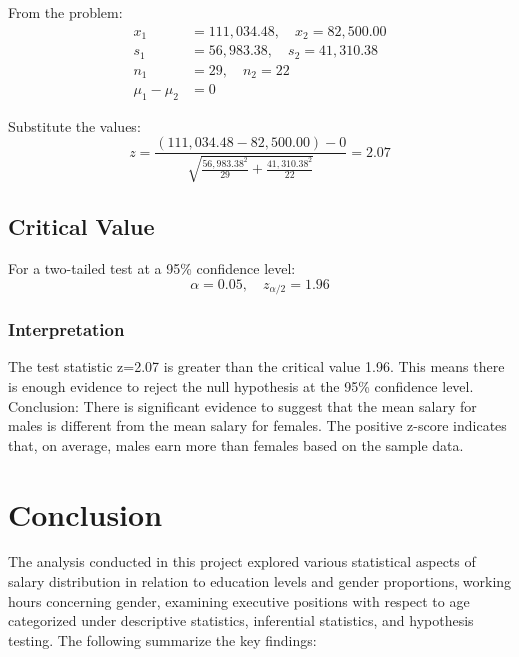 \documentclass[12pt,a4paper]{article}
\begin{document}
From the problem:
\begin{align*}
x_1 &= 111,034.48, \quad x_2 = 82,500.00 \\
s_1 &= 56,983.38, \quad s_2 = 41,310.38 \\
n_1 &= 29, \quad n_2 = 22 \\
\mu_1 - \mu_2 &= 0
\end{align*}

Substitute the values:
\[
z = \frac{(111,034.48 - 82,500.00) - 0}{\sqrt{\frac{56,983.38^2}{29} + \frac{41,310.38^2}{22}}} = 2.07
\]

\subsection*{Critical Value}
For a two-tailed test at a 95\% confidence level:
\[
\alpha = 0.05, \quad z_{\alpha/2} = 1.96
\]

\subsubsection*{Interpretation} 
The test statistic 
z=2.07 is greater than the critical value 1.96. This means there is enough evidence to reject the null hypothesis at the 95\% confidence level.\\
Conclusion: There is significant evidence to suggest that the mean salary for males is different from the mean salary for females. The positive z-score indicates that, on average, males earn more than females based on the sample data.
\newpage
\section{Conclusion}

The analysis conducted in this project explored various statistical aspects of salary distribution in relation to education levels and gender proportions, working hours concerning gender, examining executive positions with respect to age categorized under descriptive statistics, inferential statistics, and hypothesis testing. The following summarize the key findings:
\end{document}
